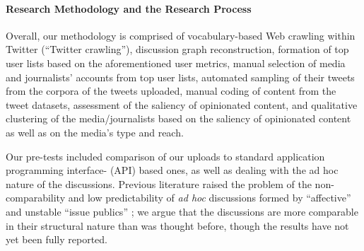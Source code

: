 \paragraph{Research Methodology and the Research Process}
Overall, our methodology is comprised of vocabulary-based Web crawling within Twitter (“Twitter crawling”), discussion graph reconstruction, formation of top user lists based on the aforementioned user metrics, manual selection of media and journalists’ accounts from top user lists, automated sampling of their tweets from the corpora of the tweets uploaded, manual coding of content from the tweet datasets, assessment of the saliency of opinionated content, and qualitative clustering of the media/journalists based on the saliency of opinionated content as well as on the media’s type and reach.

Our pre-tests included comparison of our uploads to standard application programming interface- (API) based ones, as well as dealing with the ad hoc nature of the discussions. Previous literature raised the problem of the non-comparability and low predictability of \textit{ad hoc} discussions formed by “affective” and unstable “issue publics” \cite{BrunsBurgess2015,Papacharissi}; we argue that the discussions are more comparable in their structural nature than was thought before, though the results have not yet been fully reported.

